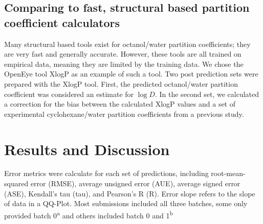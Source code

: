 \subsection{Comparing to fast, structural based partition coefficient calculators} %
\label{methods:4}
Many structural based tools exist for octanol/water partition coefficients; they are very fast and generally accurate. 
However, these tools are all trained on empirical data, meaning they are limited by the training data. 
We chose the OpenEye tool XlogP %
as an example of such a tool. 
Two post prediction sets were prepared with the XlogP tool.
First, the predicted octanol/water partition coefficient was considered an estimate for $\log D$. 
In the second set, we calculated a correction for the bias between the calculated XlogP values and a set of experimental cyclohexane/water partition coefficients from a previous study. %


\section{Results and Discussion}
\label{results:1}


\begin{table}

\label{groupStats}
\caption{Error metrics were calculate for each set of predictions, including root-mean-squared error (RMSE), average unsigned error (AUE), average signed error (ASE), Kendall's tau (tau), and Pearson's R (R). Error slope refers to the slope of data in a QQ-Plot. Most submissions included all three batches, some only provided batch 0\textsuperscript{a} and others included batch 0 and 1\textsuperscript{b}}  %
\end{table}

